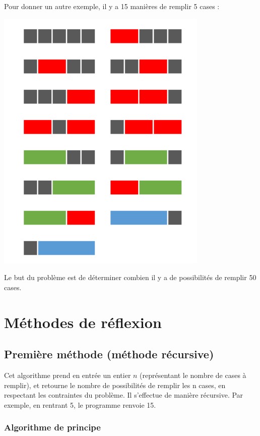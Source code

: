 \documentclass{article}
\begin{document}
\newline Pour donner un autre exemple, il y a 15 manières de remplir 5 cases :
\bigbreak
\begin{center}
\includegraphics[scale = 0.5]{Images/presentation.png}
\end{center}
\bigbreak

Le but du problème est de déterminer combien il y a de possibilités de remplir 50 cases.
\newpage
\section{Méthodes de réflexion}

\subsection{Première méthode (méthode récursive)}

Cet algorithme prend en entrée un entier $n$ (représentant le nombre de cases à remplir), et retourne le nombre de possibilités de remplir les n cases, en respectant les contraintes du problème. Il s'effectue de manière récursive. Par exemple, en rentrant 5, le programme renvoie 15.

\subsubsection{Algorithme de principe}
\end{document}

